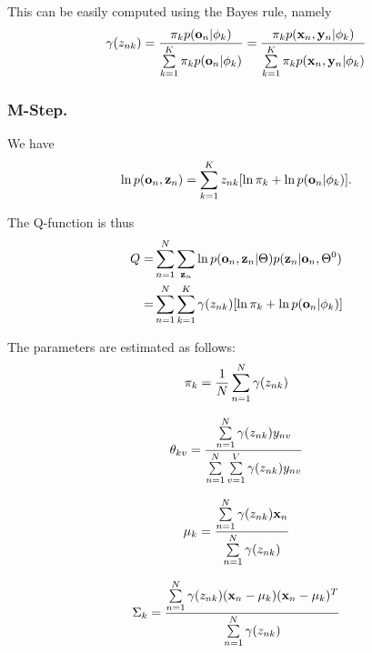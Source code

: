 This can be easily computed using the Bayes rule, namely
$$
\gamma(z_{nk}) 
= \frac{ \pi_k p(\mathbf{o}_n | \phi_k) }
{\sum\limits_{k=1}^K \pi_k p(\mathbf{o}_n | \phi_k) }
= \frac{ \pi_k p(\mathbf{x}_n, \mathbf{y}_n | \phi_k) }
{\sum\limits_{k=1}^K \pi_k p(\mathbf{x}_n, \mathbf{y}_n | \phi_k) }
$$

\subsubsection{M-Step.}
We have
$$
\ln p(\mathbf{o}_n, \mathbf{z}_n) = \sum\limits_{k=1}^K z_{nk} [\ln \pi_k + \ln p(\mathbf{o}_n | \phi_k) ].
$$

The Q-function is thus
\begin{align*}
Q = & \sum\limits_{n=1}^N \sum\limits_{\mathbf{z}_n} \ln p(\mathbf{o}_n, \mathbf{z}_n | \Theta) p(\mathbf{z}_n | \mathbf{o}_n, \Theta^0) \\
 = & \sum\limits_{n=1}^N \sum\limits_{k=1}^K \gamma(z_{nk}) [\ln \pi_k + \ln p(\mathbf{o}_n | \phi_k) ]
\end{align*}

The parameters are estimated as follows:
$$
\pi_k = \frac{1}{N} \sum\limits_{n=1}^N \gamma(z_{nk})
$$

$$
\theta_{kv} = \frac{\sum\limits_{n=1}^N \gamma(z_{nk}) y_{nv}}
{\sum\limits_{n=1}^N \sum\limits_{v=1}^V \gamma(z_{nk}) y_{nv}}
$$

$$
\mu_{k} = \frac{\sum\limits_{n=1}^N \gamma(z_{nk}) \mathbf{x}_n}
{\sum\limits_{n=1}^N \gamma(z_{nk})}
$$

$$
\Sigma_{k} = \frac{\sum\limits_{n=1}^N \gamma(z_{nk}) (\mathbf{x}_n - \mu_k) (\mathbf{x}_n - \mu_k)^T}
{\sum\limits_{n=1}^N \gamma(z_{nk})}
$$

